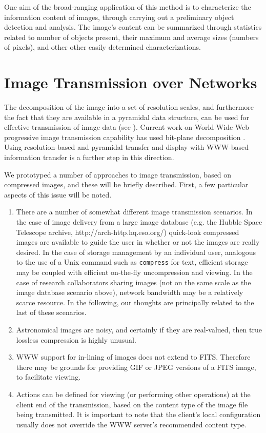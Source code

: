 One  aim of the broad-ranging application of this method is to characterize
the information content of images, through carrying out a preliminary 
object detection and analysis.  The image's content can be summarized 
through statistics related to number of objects present, their maximum and 
average sizes (numbers of pixels), and other other easily determined 
characterizations.  

\section{Image Transmission over Networks}

The decomposition of the image into a set of resolution scales, and
furthermore the fact that they are available in a pyramidal data 
structure, can be used for effective transmission of image data (see 
\cite{percival93}).  
Current work on World-Wide Web progressive image transmission capability
has used bit-plane decomposition \cite{lalich95}.
Using resolution-based and pyramidal transfer and
display with WWW-based information transfer 
is a further step in this direction.

We prototyped a number of approaches to image transmission, based on 
compressed images, and these will be briefly described.  
First, a few particular aspects of this issue will be
noted.
 
\begin{enumerate}
\item There are a number of somewhat different image transmission 
  scenarios.  In the case of image delivery from a large image database
  (e.g. the Hubble Space Telescope archive, http://arch-http.hq.eso.org/)
  quick-look compressed images are available to guide the user in whether 
  or not the images are really desired.  In the case of storage management 
  by an individual user, analogous to the use of a Unix command such as 
  {\tt compress} for text, efficient storage may be coupled with efficient
  on-the-fly uncompression and viewing.  In the case of research 
  collaborators sharing images (not on the same scale as the image database
  scenario above), network bandwidth may be a relatively scarce resource.
  In the following, our thoughts are principally related to the last of these
  scenarios.
\item Astronomical images are noisy, and certainly if they are real-valued, 
  then true lossless compression is highly unusual.
\item WWW support for in-lining of images does not extend to FITS.  Therefore
  there may be grounds for providing GIF or JPEG versions of a FITS image, 
  to facilitate viewing.
\item Actions can be defined for viewing (or performing other operations) at 
  the client end of the transmission, based on the content type of the image
  file being transmitted.  It is important to note that the client's local
  configuration usually does not override the WWW server's recommended 
  content type.
\end{enumerate}
 
